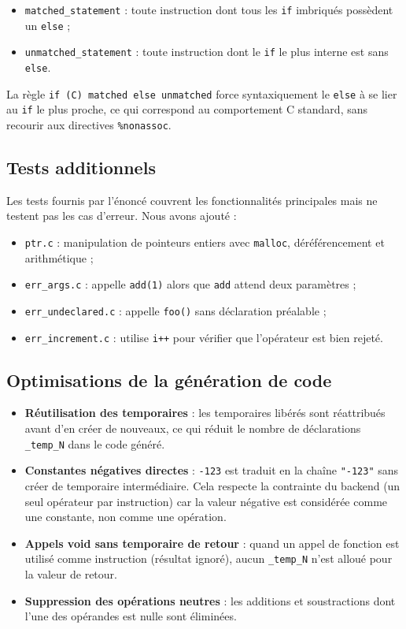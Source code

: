 \documentclass[12pt,a4paper]{article}
\begin{document}
\begin{itemize}
  \item \texttt{matched\_statement} : toute instruction dont tous les \texttt{if} imbriqués possèdent un \texttt{else} ;
  \item \texttt{unmatched\_statement} : toute instruction dont le \texttt{if} le plus interne est sans \texttt{else}.
\end{itemize}

La règle \texttt{if (C) matched else unmatched} force syntaxiquement le \texttt{else} à se lier au \texttt{if} le plus proche, ce qui correspond au comportement C standard, sans recourir aux directives \texttt{\%nonassoc}.

\subsection{Tests additionnels}

Les tests fournis par l'énoncé couvrent les fonctionnalités principales mais ne testent pas les cas d'erreur. Nous avons ajouté :
\begin{itemize}
  \item \texttt{ptr.c} : manipulation de pointeurs entiers avec \texttt{malloc}, déréférencement et arithmétique ;
  \item \texttt{err\_args.c} : appelle \texttt{add(1)} alors que \texttt{add} attend deux paramètres ;
  \item \texttt{err\_undeclared.c} : appelle \texttt{foo()} sans déclaration préalable ;
  \item \texttt{err\_increment.c} : utilise \texttt{i++} pour vérifier que l'opérateur est bien rejeté.
\end{itemize}

\subsection{Optimisations de la génération de code}

\begin{itemize}
  \item \textbf{Réutilisation des temporaires} : les temporaires libérés sont réattribués avant d'en créer de nouveaux, ce qui réduit le nombre de déclarations \texttt{\_temp\_N} dans le code généré.
  \item \textbf{Constantes négatives directes} : \texttt{-123} est traduit en la chaîne \texttt{"-123"} sans créer de temporaire intermédiaire. Cela respecte la contrainte du backend (un seul opérateur par instruction) car la valeur négative est considérée comme une constante, non comme une opération.
  \item \textbf{Appels void sans temporaire de retour} : quand un appel de fonction est utilisé comme instruction (résultat ignoré), aucun \texttt{\_temp\_N} n'est alloué pour la valeur de retour.
  \item \textbf{Suppression des opérations neutres} : les additions et soustractions dont l'une des opérandes est nulle sont éliminées.
\end{itemize}
\end{document}
